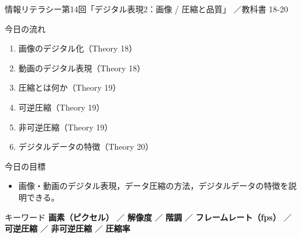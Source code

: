 \documentclass[aspectratio=43,professionalfonts,handout,10pt]{beamer}
\newcommand{\LectureNum}{14}
\newcommand{\LectureTitle}{デジタル表現2：画像 / 圧縮と品質}
\newcommand{\CourseName}{情報リテラシー}
\newcommand{\TextPages}{18-20}
\begin{document}

\begin{frame}[shrink=5]{\CourseName\quad 第\LectureNum 回「\LectureTitle 」}
  {\small \TermName\quad \TeacherName\quad ／\quad 教科書 \TextPages}

  \vfill

  \begin{block}{今日の流れ}
    \begin{enumerate}
      \item 画像のデジタル化（Theory 18）
      \item 動画のデジタル表現（Theory 18）
      \item 圧縮とは何か（Theory 19）
      \item 可逆圧縮（Theory 19）
      \item 非可逆圧縮（Theory 19）
      \item デジタルデータの特徴（Theory 20）
    \end{enumerate}
  \end{block}
  \vfill

  \begin{block}{今日の目標}
    \begin{itemize}
      \item 画像・動画のデジタル表現，データ圧縮の方法，デジタルデータの特徴を説明できる。
    \end{itemize}
  \end{block}
  \vfill

  \begin{exampleblock}{キーワード}
    \small \textbf{画素（ピクセル）} ／ \textbf{解像度} ／ \textbf{階調} ／ \textbf{フレームレート（fps）} ／ \textbf{可逆圧縮} ／ \textbf{非可逆圧縮} ／ \textbf{圧縮率}
  \end{exampleblock}
\end{frame}

\end{document}
